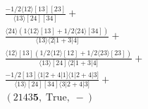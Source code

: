\documentclass[varwidth, border=5pt]{standalone}
\begin{document}
\begin{my}
$\begin{gathered}
\scriptscriptstyle\frac{-1/2⟨12⟩[13][23]}{⟨13⟩[24][34]} +\\
\scriptscriptstyle\frac{⟨24⟩(1⟨12⟩[13]+1/2⟨24⟩[34])}{⟨13⟩⟨2|1+3|4]} +\\
\scriptscriptstyle\frac{⟨12⟩[13](1/2⟨12⟩[12]+1/2⟨23⟩[23])}{⟨13⟩[24]⟨2|1+3|4]} +\\
\scriptscriptstyle\frac{-1/2[13]⟨1|2+4|1]⟨1|2+4|3]}{⟨13⟩[24][34]⟨3|2+4|3]} +\\
\scriptscriptstyle(2143𝟓,\;\text{True},\;-) \phantom{+}
\end{gathered}$
\end{my}
\end{document}
